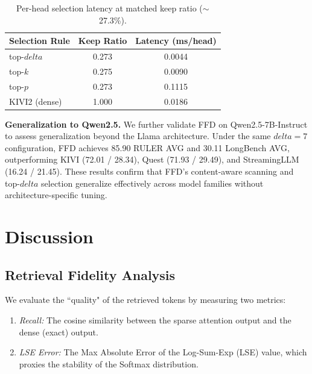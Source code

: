 \documentclass[]{mosi}
\def\delta{delta}%
\theoremstyle{plain}
\theoremstyle{definition}
\theoremstyle{remark}
\begin{document}
\begin{table}[t]
\caption{Per-head selection latency at matched keep ratio ($\sim$27.3\%).}
\label{tab:selection_overhead}
\begin{center}
\begin{small}
\begin{sc}
\begin{tabular}{lcc}
\toprule
Selection Rule & Keep Ratio & Latency (ms/head) \\
\midrule
top-$\delta$ & 0.273 & 0.0044 \\
top-$k$      & 0.275 & 0.0090 \\
top-$p$      & 0.273 & 0.1115 \\
KIVI2 (dense) & 1.000 & 0.0186 \\
\bottomrule
\end{tabular}
\end{sc}
\end{small}
\end{center}
\vskip -0.1in
\end{table}

\textbf{Generalization to Qwen2.5.} We further validate FFD on Qwen2.5-7B-Instruct to assess generalization beyond the Llama architecture. Under the same $\delta=7$ configuration, FFD achieves 85.90 RULER AVG and 30.11 LongBench AVG, outperforming KIVI (72.01 / 28.34), Quest (71.93 / 29.49), and StreamingLLM (16.24 / 21.45). These results confirm that FFD's content-aware scanning and top-$\delta$ selection generalize effectively across model families without architecture-specific tuning.



\section{Discussion}

\subsection{Retrieval Fidelity Analysis}
We evaluate the ``quality" of the retrieved tokens by measuring two metrics:
\begin{enumerate}
    \itemsep0em
    \item \textit{Recall:} The cosine similarity between the sparse attention output and the dense (exact) output.
    \item \textit{LSE Error:} The Max Absolute Error of the Log-Sum-Exp (LSE) value, which proxies the stability of the Softmax distribution.
\end{enumerate}
\end{document}
